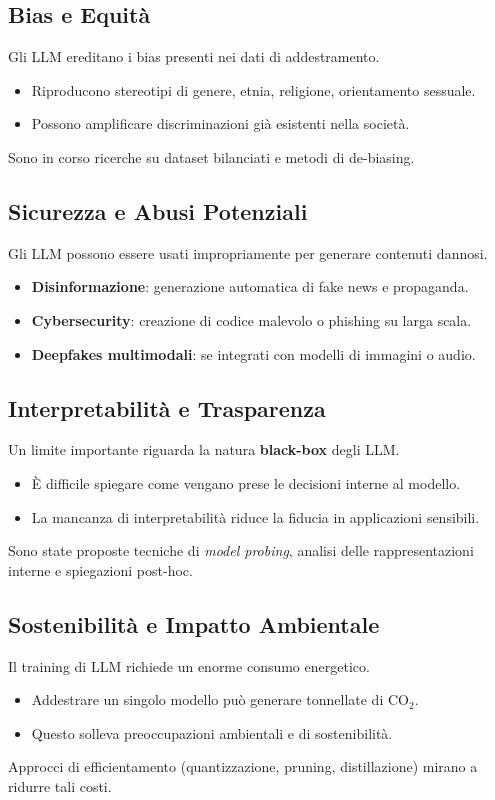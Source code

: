 \subsection{Bias e Equità}
Gli LLM ereditano i bias presenti nei dati di addestramento.
\begin{itemize}
    \item Riproducono stereotipi di genere, etnia, religione, orientamento sessuale.
    \item Possono amplificare discriminazioni già esistenti nella società.
\end{itemize}
Sono in corso ricerche su dataset bilanciati e metodi di de-biasing.

\subsection{Sicurezza e Abusi Potenziali}
Gli LLM possono essere usati impropriamente per generare contenuti dannosi.
\begin{itemize}
    \item \textbf{Disinformazione}: generazione automatica di fake news e propaganda.
    \item \textbf{Cybersecurity}: creazione di codice malevolo o phishing su larga scala.
    \item \textbf{Deepfakes multimodali}: se integrati con modelli di immagini o audio.
\end{itemize}

\subsection{Interpretabilità e Trasparenza}
Un limite importante riguarda la natura \textbf{black-box} degli LLM.
\begin{itemize}
    \item È difficile spiegare come vengano prese le decisioni interne al modello.
    \item La mancanza di interpretabilità riduce la fiducia in applicazioni sensibili.
\end{itemize}
Sono state proposte tecniche di \textit{model probing}, analisi delle rappresentazioni interne e spiegazioni post-hoc.

\subsection{Sostenibilità e Impatto Ambientale}
Il training di LLM richiede un enorme consumo energetico.
\begin{itemize}
    \item Addestrare un singolo modello può generare tonnellate di CO$_2$.
    \item Questo solleva preoccupazioni ambientali e di sostenibilità.
\end{itemize}
Approcci di efficientamento (quantizzazione, pruning, distillazione) mirano a ridurre tali costi.

